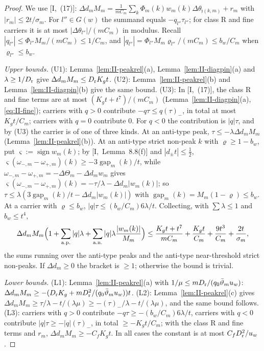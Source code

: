 \documentclass[10pt]{amsart}
\theoremstyle{definition}
\theoremstyle{remark}
\newcommand{\sgn}{\operatorname{sign}}
\newcommand{\gap}{\operatorname{gap}}
\begin{document}
\begin{proof}
We use [I,~(17)]: $\Delta d_mM_m=\frac1{mC_m}\sum_k\Phi_m(k)w_m(k)
\Delta\theta_{\mathfrak j(k,m)}+r_m$ with $|r_m|\le2t/\sigma_m$.  For
$l''\in G(w)$ the summand equals $-q_{l''}\tau_{l''}$; for class R and fine
carriers it is at most $|\Delta\theta_{l''}|/(mC_m)$ in modulus.  Recall
$|q_{l''}|\le\Phi_{l''}M_m/(mC_m)\le1/C_m$, and $|q_{l''}|=\Phi_{l''}M_m
\varrho_{l''}/(mC_m)\le b_w/C_m$ when $\varrho_{l''}\le b_w$.

\emph{Upper bounds.}  (U1): Lemma~\ref{lem:II-peakrel}(a),
Lemma~\ref{lem:II-diagpin}(a) and $\lambda\ge1/D_{\rm r}$ give $\Delta d_m
M_m\le D_{\rm r}K_gt$.  (U2): Lemma~\ref{lem:II-peakrel}(b) and
Lemma~\ref{lem:II-diagpin}(b) give the same bound.  (U3): In
[I,~(17)], the class R and fine terms are at most $(K_gt+t^7)/(mC_m)$
(Lemma~\ref{lem:II-diagpin}(a), \eqref{eq:II-fine}); carriers with $q>0$
contribute $-q\tau\le q(\tau)_-$, in total at most $K_gt/C_m$; carriers
with $q=0$ contribute $0$.  For $q<0$ the contribution is $|q|\tau$, and by
(U3) the carrier is of one of three kinds.  At an anti-type peak,
$\tau\le-\lambda\Delta d_mM_m$ (Lemma~\ref{lem:II-peakrel}(b)).  At an
anti-type strict non-peak $k$ with $\varrho\ge1-b_w$, put $\varsigma:=\sgn
w_m(k)$; by [I,~Lemma~8.8(f)] and $|d_\pm t|\le\frac12$,
$\varsigma(\omega_{-,m}-\omega_{+,m})(k)\ge-3\gap_m(k)/t$, while
$\omega_{-,m}-\omega_{+,m}=-\Delta\Theta_m-\Delta d_mw_m$ gives
$\varsigma(\omega_{-,m}-\omega_{+,m})(k)=-\tau/\lambda-\Delta d_m|w_m(k)|$;
so $\tau\le\lambda(3\gap_m(k)/t-\Delta d_m|w_m(k)|)$ with $\gap_m(k)=M_m(1-
\varrho)\le b_w$.  At a carrier with $\varrho\le b_w$, $|q|\tau\le(b_w/C_m)
6\lambda/t$.  Collecting, with $\sum\lambda\le1$ and $b_w\le t^4$,
\[
 \Delta d_mM_m\Big(1+\sum_{\rm a.p.}|q|\lambda+\sum_{\rm a.n.}|q|\lambda
 \frac{|w_m(k)|}{M_m}\Big)\le\frac{K_gt+t^7}{mC_m}+\frac{K_gt}{C_m}+
 \frac{9t^3}{C_m}+\frac{2t}{\sigma_m},
\]
the sums running over the anti-type peaks and the anti-type near-threshold
strict non-peaks.  If $\Delta d_m\ge0$ the bracket is $\ge1$; otherwise the
bound is trivial.

\emph{Lower bounds.}  (L1): Lemma~\ref{lem:II-peakrel}(a) with
$1/\mu\le mD_{\rm r}/(q_0\bar\vartheta_mu_w)$: $\Delta d_mM_m\ge-(D_{\rm r}K_g+
mD_{\rm r}^2/(q_0\bar\vartheta_mu_w))t$.  (L2): Lemma~\ref{lem:II-peakrel}(c) gives
$\Delta d_mM_m\ge\tau/\lambda-t/(\lambda\mu)\ge-(\tau)_-/\lambda-
t/(\lambda\mu)$, and the same bound follows.  (L3): carriers with $q>0$
contribute $-q\tau\ge-(b_w/C_m)6\lambda/t$, carriers with $q<0$ contribute
$|q|\tau\ge-|q|(\tau)_-$, in total $\ge-K_gt/C_m$; with the class R and
fine terms and $r_m$, $\Delta d_mM_m\ge-C_fK_gt$.  In all cases the constant
is at most $C_fD_{\rm r}^2/u_w$.
\end{proof}
\end{document}
